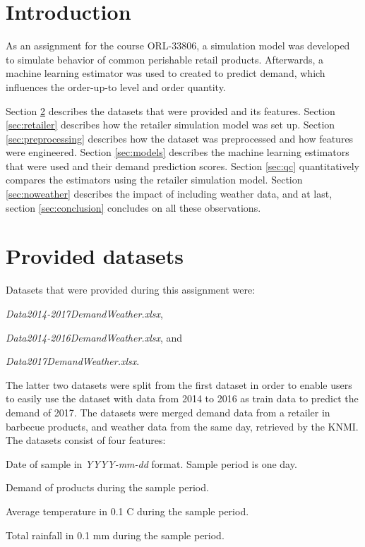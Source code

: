 \documentclass[final,authoryear,5p,times,twocolumn, 11pt]{elsarticle}
\begin{document}

\section{Introduction}
\label{sec:introduction}
As an assignment for the course ORL-33806, a simulation model was developed to simulate behavior of common perishable retail products. Afterwards, a machine learning estimator was used to created to predict demand, which influences the order-up-to level and order quantity.

Section \ref{sec:prov_data} describes the datasets that were provided and its features. Section \ref{sec:retailer} describes how the retailer simulation model was set up. Section \ref{sec:preprocessing} describes how the dataset was preprocessed and how features were engineered. Section \ref{sec:models} describes the machine learning estimators that were used and their demand prediction scores. Section \ref{sec:qc} quantitatively compares the estimators using the retailer simulation model. Section \ref{sec:noweather} describes the impact of including weather data, and at last, section \ref{sec:conclusion} concludes on all these observations.

\section{Provided datasets}
\label{sec:prov_data}
Datasets that were provided during this assignment were: 
\begin{enumerate*}[label=\roman*]
	\item \textit{Data2014-2017DemandWeather.xlsx}, 
	\item \textit{Data2014-2016DemandWeather.xlsx}, and 
	\item \textit{Data2017DemandWeather.xlsx}.
\end{enumerate*}
 

The latter two datasets were split from the first dataset in order to enable users to easily use the dataset with data from 2014 to 2016 as train data to predict the demand of 2017. The datasets were merged demand data from a retailer in barbecue products, and weather data from the same day, retrieved by the KNMI. The datasets consist of four features: 
\begin{description}[noitemsep]
	\item[Date] Date of sample in \textit{YYYY-mm-dd} format. Sample period is one day.
	\item [demand] Demand of products during the sample period.
	\item [TempTimes10] Average temperature in 0.1 \degree C during the sample period.
	\item [RainfallTimes10] Total rainfall in 0.1 mm during the sample period.
\end{description}
\end{document}
